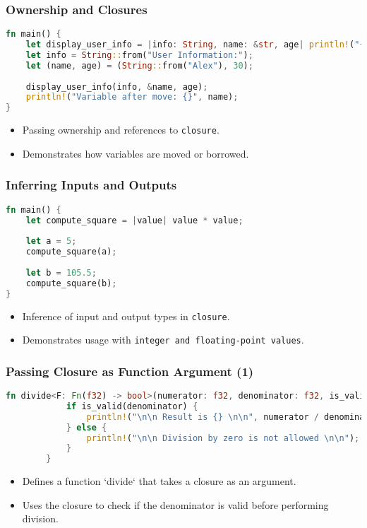 \documentclass[aspectratio=169, table]{beamer}
\begin{document}
\begin{frame}[fragile]
\frametitle{Ownership and Closures}
\begin{lstlisting}[language=Rust]
fn main() {
	let display_user_info = |info: String, name: &str, age| println!("{}\n\t{}: {}", info, name, age);
	let info = String::from("User Information:");
	let (name, age) = (String::from("Alex"), 30);
	
	display_user_info(info, &name, age);
	println!("Variable after move: {}", name);
}
\end{lstlisting}
\begin{itemize}
\item Passing ownership and references to \texttt{closure}.
\item Demonstrates how variables are moved or borrowed.
\end{itemize}
\end{frame}

\begin{frame}[fragile]
\frametitle{Inferring Inputs and Outputs}
\begin{lstlisting}[language=Rust]
fn main() {
	let compute_square = |value| value * value;
	
	let a = 5;
	compute_square(a);
	
	let b = 105.5;
	compute_square(b);
}
\end{lstlisting}
\begin{itemize}
\item Inference of input and output types in \texttt{closure}.
\item Demonstrates usage with \texttt{integer\ and\ floating-point\ values}.
\end{itemize}
\end{frame}

\begin{frame}[fragile]
	\frametitle{Passing Closure as Function Argument (1)}
	\begin{lstlisting}[language=Rust]
		fn divide<F: Fn(f32) -> bool>(numerator: f32, denominator: f32, is_valid: F) {
			if is_valid(denominator) {
				println!("\n\n Result is {} \n\n", numerator / denominator);
			} else {
				println!("\n\n Division by zero is not allowed \n\n");
			}
		}
	\end{lstlisting}
	\begin{itemize}
		\item Defines a function `divide` that takes a closure as an argument.
		\item Uses the closure to check if the denominator is valid before performing division.
	\end{itemize}
\end{frame}
\end{document}
